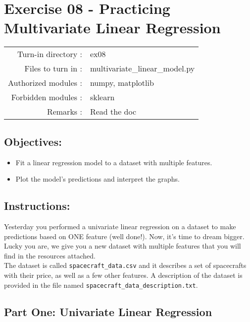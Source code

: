 \documentclass[]{article}
\begin{document}
\clearpage

\hypertarget{exercise-08---practicing-multivariate-linear-regression-1}{%
\section{Exercise 08 - Practicing Multivariate Linear
Regression}\label{exercise-08---practicing-multivariate-linear-regression-1}}

\begin{longtable}[]{@{}rl@{}}
\toprule
\endhead
Turn-in directory : & ex08\tabularnewline
Files to turn in : & multivariate\_linear\_model.py\tabularnewline
Authorized modules : & numpy, matplotlib\tabularnewline
Forbidden modules : & sklearn\tabularnewline
Remarks : & Read the doc\tabularnewline
\bottomrule
\end{longtable}

\hypertarget{objectives-6}{%
\subsection{Objectives:}\label{objectives-6}}

\begin{itemize}
\item
  Fit a linear regression model to a dataset with multiple features.
\item
  Plot the model's predictions and interpret the graphs.
\end{itemize}

\hypertarget{instructions-7}{%
\subsection{Instructions:}\label{instructions-7}}

Yesterday you performed a univariate linear regression on a dataset to
make predictions based on ONE feature (well done!). Now, it's time to
dream bigger. Lucky you are, we give you a new dataset with multiple
features that you will find in the resources attached.\\
The dataset is called \texttt{spacecraft\_data.csv} and it describes a
set of spacecrafts with their price, as well as a few other features. A
description of the dataset is provided in the file named
\texttt{spacecraft\_data\_description.txt}.

\hypertarget{part-one-univariate-linear-regression}{%
\subsection{Part One: Univariate Linear
Regression}\label{part-one-univariate-linear-regression}}
\end{document}
